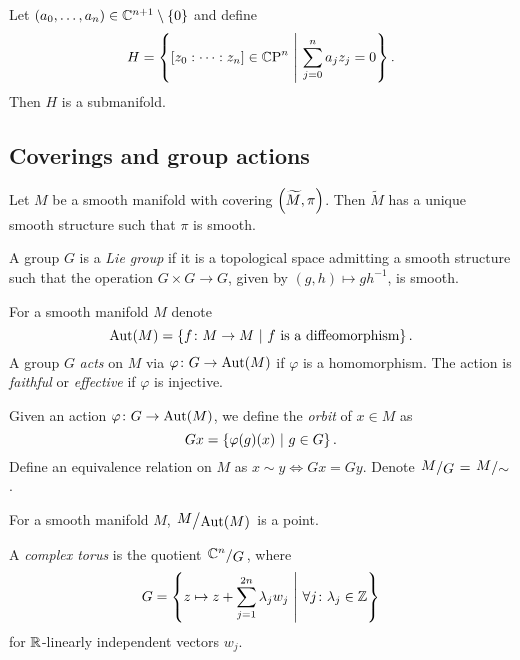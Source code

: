 \begin{trditev}
Let $(a_0, \dots, a_n) \in \mathbb{C}^{n+1} \setminus \left\{0\right\}$ and define
\[
H =
\left\{[z_0 : \dots : z_n] \in \mathbb{C}\!\operatorname{P}^{n}~\middle\vert~\sum_{j=0}^n a_j z_j = 0\right\}.
\]
Then $H$ is a submanifold.
\end{trditev}

\newpage

\subsection{Coverings and group actions}

\begin{trditev}
Let $M$ be a smooth manifold with covering
$\left(\widetilde{M},\pi\right)$. Then $\widetilde{M}$ has a unique smooth
structure such that $\pi$ is smooth.
\end{trditev}

\begin{definicija}
A group $G$ is a \emph{Lie group} if it is a
topological space admitting a smooth structure such that the
operation $G \times G \to G$, given by $(g,h) \mapsto g h^{-1}$, is
smooth.
\end{definicija}

\begin{definicija}
For a smooth manifold $M$ denote
\[
\operatorname{Aut}(M) = \left\{f \colon M \to M~\middle\vert~\text{$f$ is a diffeomorphism}\right\}.
\]
A group $G$ \emph{acts} on $M$ via
$\varphi \colon G \to \operatorname{Aut}(M)$ if $\varphi$ is a homomorphism. The
action is \emph{faithful} or
\emph{effective} if $\varphi$ is injective.
\end{definicija}

\begin{definicija}
Given an action $\varphi \colon G \to \operatorname{Aut}(M)$, we define the
\emph{orbit} of $x \in M$ as
\[
Gx = \left\{\varphi(g)(x)~\middle\vert~g \in G\right\}.
\]
Define an equivalence relation on $M$ as $x \sim y \iff Gx = Gy$.
Denote $\kvoc{M}{G} = \kvoc{M}{\sim}$.
\end{definicija}

\begin{opomba}
For a smooth manifold $M$, $\kvoc{M}{\Aut(M)}$ is a point.
\end{opomba}

\begin{definicija}
A \emph{complex torus} is the quotient
$\kvoc{\C^n}{G}$, where
\[
G =
\left\{z \mapsto z + \sum_{j=1}^{2n} \lambda_j w_j~\middle\vert~\forall j \colon \lambda_j \in \mathbb{Z}\right\}
\]
for $\mathbb{R}$-linearly independent vectors $w_j$.
\end{definicija}

